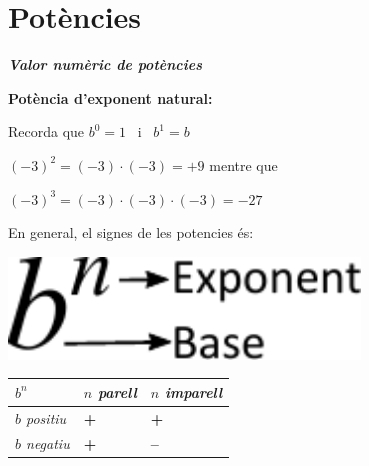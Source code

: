 \newpage
\section{Potències}

\begin{center}
	\renewcommand*\baselinestretch {1.25}
	
	\begin{theorybox}
		
		\begin{minipage}{0.75\textwidth}
			
			
			\textbf{\textit{Valor numèric de potències}}
			
			\textbf{Potència d'exponent natural: }
			
			Recorda que $b^{0} = 1$ \, i \, $b^{1} = b$
			
			$(-3)^{2}= (-3)\cdot(-3)=+9$  \quad   mentre que 
			
			$(-3)^{3} = (-3)\cdot(-3)\cdot(-3)=-27$
			
			En general, el signes de les potencies és:
			
		\end{minipage}
		\begin{minipage}{0.25\textwidth}
			\centering
			\includegraphics[width=0.7\textwidth]{img-02/potencia}
		\end{minipage}
		
		\begin{longtable}{|p{1.4in}|p{1.3in}|p{1.3in}|} \hline 
			\rowcolor{lightgray}\textbf{$b^{n}$} & \textit{$n$ parell} & \textit{$n$ imparell} \\ \hline 
			\cellcolor{lightgray}\textit{$b$ positiu} & \textbf{+} & \textbf{+} \\ \hline 
			\cellcolor{lightgray}\textit{$b$ negatiu} & \textbf{+} & \textbf{--} \\ \hline 
		\end{longtable}
		
	\end{theorybox}
\end{center}

